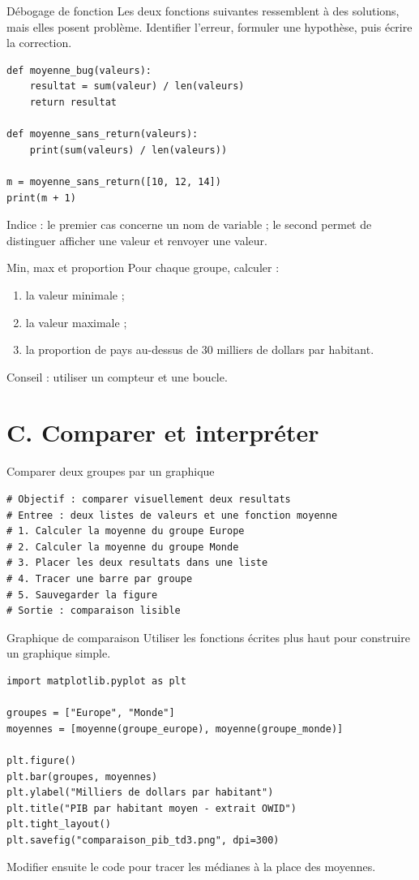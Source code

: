 \documentclass[11pt,a4paper]{article}
\begin{document}
\begin{mandatoryexercise}{Débogage de fonction}
Les deux fonctions suivantes ressemblent à des solutions, mais elles posent problème. Identifier l'erreur, formuler une hypothèse, puis écrire la correction.
\begin{lstlisting}
def moyenne_bug(valeurs):
    resultat = sum(valeur) / len(valeurs)
    return resultat

def moyenne_sans_return(valeurs):
    print(sum(valeurs) / len(valeurs))

m = moyenne_sans_return([10, 12, 14])
print(m + 1)
\end{lstlisting}
Indice : le premier cas concerne un nom de variable ; le second permet de distinguer afficher une valeur et renvoyer une valeur.
\end{mandatoryexercise}

\begin{mandatoryexercise}{Min, max et proportion}
Pour chaque groupe, calculer :
\begin{enumerate}
  \item la valeur minimale ;
  \item la valeur maximale ;
  \item la proportion de pays au-dessus de 30 milliers de dollars par habitant.
\end{enumerate}
Conseil : utiliser un compteur et une boucle.
\end{mandatoryexercise}

\section*{C. Comparer et interpréter}

\begin{pseudocodeexercise}{Comparer deux groupes par un graphique}
\begin{lstlisting}
# Objectif : comparer visuellement deux resultats
# Entree : deux listes de valeurs et une fonction moyenne
# 1. Calculer la moyenne du groupe Europe
# 2. Calculer la moyenne du groupe Monde
# 3. Placer les deux resultats dans une liste
# 4. Tracer une barre par groupe
# 5. Sauvegarder la figure
# Sortie : comparaison lisible
\end{lstlisting}
\end{pseudocodeexercise}

\begin{mandatoryexercise}{Graphique de comparaison}
Utiliser les fonctions écrites plus haut pour construire un graphique simple.
\begin{lstlisting}
import matplotlib.pyplot as plt

groupes = ["Europe", "Monde"]
moyennes = [moyenne(groupe_europe), moyenne(groupe_monde)]

plt.figure()
plt.bar(groupes, moyennes)
plt.ylabel("Milliers de dollars par habitant")
plt.title("PIB par habitant moyen - extrait OWID")
plt.tight_layout()
plt.savefig("comparaison_pib_td3.png", dpi=300)
\end{lstlisting}
Modifier ensuite le code pour tracer les médianes à la place des moyennes.
\end{mandatoryexercise}
\end{document}

